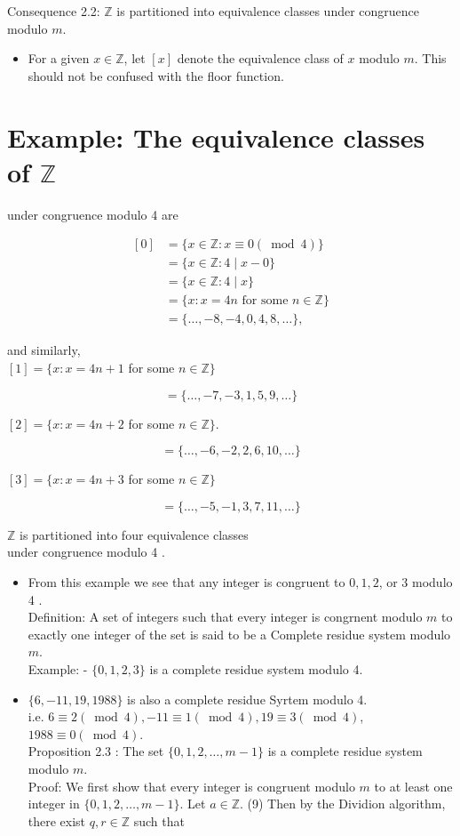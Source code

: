 \documentclass[10pt]{article}
\begin{document}
Consequence 2.2: $\mathbb{Z}$ is partitioned into equivalence classes under congruence modulo $m$.

\begin{itemize}
  \item For a given $x \in \mathbb{Z}$, let $[x]$ denote the equivalence class of $x$ modulo $m$. This should not be confused with the floor function.
\end{itemize}

\section*{Example: The equivalence classes of $\mathbb{Z}$}
under congruence modulo 4 are

$$
\begin{aligned}
{[0] } & =\{x \in \mathbb{Z}: x \equiv 0(\bmod 4)\} \\
& =\{x \in \mathbb{Z}: 4 \mid x-0\} \\
& =\{x \in \mathbb{Z}: 4 \mid x\} \\
& =\{x: x=4 n \text { for some } n \in \mathbb{Z}\} \\
& =\{\ldots,-8,-4,0,4,8, \ldots\},
\end{aligned}
$$

and similarly,\\
$[1]=\{x: x=4 n+1$ for some $n \in \mathbb{Z}\}$

$$
=\{\ldots,-7,-3,1,5,9, \ldots\}
$$

$[2]=\{x: x=4 n+2$ for some $n \in \mathbb{Z}\}$.

$$
=\{\ldots,-6,-2,2,6,10, \ldots\}
$$

$[3]=\{x: x=4 n+3$ for some $n \in \mathbb{Z}\}$

$$
=\{\ldots,-5,-1,3,7,11, \ldots\}
$$

$\mathbb{Z}$ is partitioned into four equivalence classes\\
under congruence modulo 4 .

\begin{itemize}
  \item From this example we see that any integer is congruent to $0,1,2$, or 3 modulo 4 .\\
Definition: A set of integers such that every integer is congrnent modulo $m$ to exactly one integer of the set is said to be a Complete residue system modulo $m$.\\
Example: - $\{0,1,2,3\}$ is a complete residue system modulo 4.
  \item $\{6,-11,19,1988\}$ is also a complete residue Syrtem modulo 4.\\
i.e. $6 \equiv 2(\bmod 4),-11 \equiv 1(\bmod 4), 19 \equiv 3(\bmod 4)$, $1988 \equiv 0(\bmod 4)$.\\
Proposition 2.3 : The set $\{0,1,2, \ldots, m-1\}$ is a complete residue system modulo $m$.\\
Proof: We first show that every integer is congruent modulo $m$ to at least one\\
integer in $\{0,1,2, \ldots, m-1\}$. Let $a \in \mathbb{Z}$. (9) Then by the Dividion algorithm, there exist $q, r \in \mathbb{Z}$ such that
\end{itemize}
\end{document}
